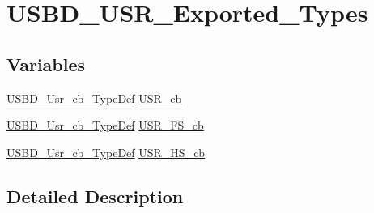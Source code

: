 \hypertarget{group___u_s_b_d___u_s_r___exported___types}{\section{U\-S\-B\-D\-\_\-\-U\-S\-R\-\_\-\-Exported\-\_\-\-Types}
\label{group___u_s_b_d___u_s_r___exported___types}
}
\subsection*{Variables}
\begin{DoxyCompactItemize}
\item 
\hyperlink{group___u_s_b___c_o_r_e___exported___types_ga333d185c45dd40a75aac486dd49b7160}{U\-S\-B\-D\-\_\-\-Usr\-\_\-cb\-\_\-\-Type\-Def} \hyperlink{group___u_s_b_d___u_s_r___exported___types_ga52488b10fa93886ec45cc041df9a3501}{U\-S\-R\-\_\-cb}
\item 
\hyperlink{group___u_s_b___c_o_r_e___exported___types_ga333d185c45dd40a75aac486dd49b7160}{U\-S\-B\-D\-\_\-\-Usr\-\_\-cb\-\_\-\-Type\-Def} \hyperlink{group___u_s_b_d___u_s_r___exported___types_gaf8b68bed6f9003326540886458eff700}{U\-S\-R\-\_\-\-F\-S\-\_\-cb}
\item 
\hyperlink{group___u_s_b___c_o_r_e___exported___types_ga333d185c45dd40a75aac486dd49b7160}{U\-S\-B\-D\-\_\-\-Usr\-\_\-cb\-\_\-\-Type\-Def} \hyperlink{group___u_s_b_d___u_s_r___exported___types_ga4263599b29aa3c81c789da827a235588}{U\-S\-R\-\_\-\-H\-S\-\_\-cb}
\end{DoxyCompactItemize}


\subsection{Detailed Description}


